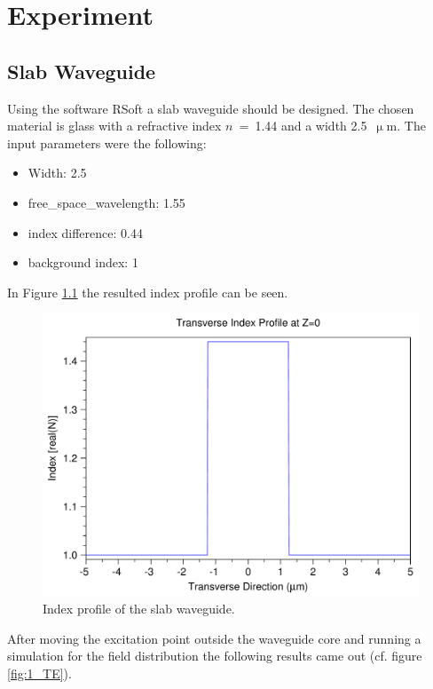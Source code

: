\chapter{Experiment}
\section{Slab Waveguide}
Using the software RSoft a slab waveguide should be designed. The chosen material is glass with a refractive index $n$~=~1.44 and a width 2.5~$\upmu$m.  The input parameters were the following:
\begin{itemize}
	\item Width: 2.5
	\item free\_space\_wavelength: 1.55
	\item index difference: 0.44
	\item background index: 1
 \end{itemize}



In Figure \ref{fig:1_index} the resulted index profile can be seen.
\begin{figure}[h]%
\centering
\includegraphics[totalheight=5.5 cm]{Grafiken/1_index.pdf}%
\caption{Index profile of the slab waveguide.}%
\label{fig:1_index}%
\end{figure}

After moving the excitation point outside the waveguide core and running a simulation for the field distribution the following results came out (cf. figure \ref{fig:1_TE}).

